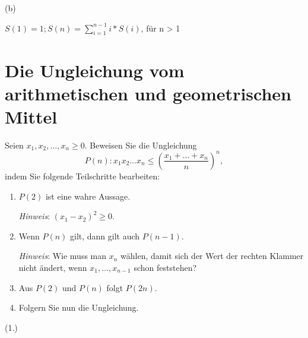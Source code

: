 \begin{flushleft}
	(b)
\end{flushleft}
\begin{center}
$S(1) = 1; S(n) = \displaystyle\sum_{i=1}^{n-1}i * S(i)$, für n > 1 
\end{center}

\newpage

\section{Die Ungleichung vom arithmetischen und geometrischen Mittel}


Seien $x_1, x_2, \ldots, x_n \geq 0$. Beweisen Sie
die Ungleichung
\[
P(n): x_1 x_2 \ldots x_n
\leq\left(\frac{x_1+\dots+x_n}{n}\right)^n,
\]
indem Sie folgende Teilschritte bearbeiten:
\begin{enumerate}
  \item $P(2)$ ist eine wahre Aussage.

     \emph{Hinweis}: $(x_1 - x_2)^2 \geq 0$.
  \item
     Wenn $P(n)$ gilt, dann gilt auch $P(n-1)$.

     \emph{Hinweis}: Wie muss man $x_n$ w\"ahlen, damit 
     sich der Wert der rechten Klammer nicht \"andert, wenn
     $x_1, \ldots, x_{n-1}$ schon feststehen?

   \item Aus $P(2)$ und $P(n)$ folgt $P(2n)$.
   \item Folgern Sie nun die Ungleichung. 
\end{enumerate}

\begin{flushleft}
	(1.)
\end{flushleft}


